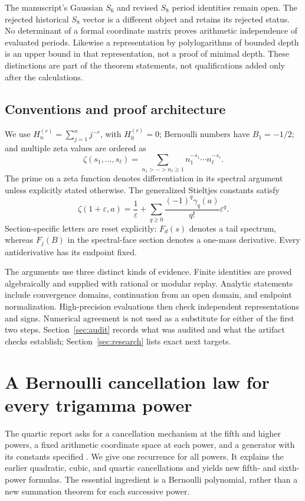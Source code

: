 \documentclass[11pt,a4paper]{article}
\numberwithin{equation}{section}
\theoremstyle{definition}
\theoremstyle{remark}
\begin{document}
The manuscript's Gaussian $S_6$ and revised $S_8$ period identities
remain open. The rejected historical $S_8$ vector is a different object
and retains its rejected status. No determinant of a formal coordinate
matrix proves arithmetic independence of evaluated periods. Likewise a
representation by polylogarithms of bounded depth is an upper bound in
that representation, not a proof of minimal depth. These distinctions
are part of the theorem statements, not qualifications added only after
the calculations.

\subsection{Conventions and proof architecture}

We use $H_n^{(r)}=\sum_{j=1}^n j^{-r}$, with $H_0^{(r)}=0$;
Bernoulli numbers have $B_1=-1/2$; and multiple zeta values are ordered
as
\[
 \zeta(s_1,\ldots,s_\ell)
 =\sum_{n_1>\cdots>n_\ell\ge1}
                         n_1^{-s_1}\cdots n_\ell^{-s_\ell}.
\]
The prime on a zeta function denotes differentiation in its spectral
argument unless explicitly stated otherwise. The generalized Stieltjes
constants satisfy
\[
 \zeta(1+\varepsilon,a)=\frac1\varepsilon+
       \sum_{q\ge0}\frac{(-1)^q\gamma_q(a)}{q!}\varepsilon^q.
\]
Section-specific letters are reset explicitly: $F_d(s)$ denotes a tail
spectrum, whereas $F_j(B)$ in the spectral-face section denotes a
one-mass derivative. Every antiderivative has its endpoint fixed.

The arguments use three distinct kinds of evidence. Finite identities
are proved algebraically and supplied with rational or modular replay.
Analytic statements include convergence domains, continuation from an
open domain, and endpoint normalization. High-precision evaluations
then check independent representations and signs. Numerical agreement
is not used as a substitute for either of the first two steps.
Section~\ref{sec:audit} records what was audited and what the artifact
checks establish; Section~\ref{sec:research} lists exact next targets.



\section{A Bernoulli cancellation law for every trigamma power}
\label{tp:sec:allpowers}

The quartic report asks for a cancellation mechanism at the fifth and
higher powers, a fixed arithmetic coordinate space at each power, and a
generator with its constants specified \cite[Research question R4]{RepoQuartic}.
We give one recurrence for all powers.  It explains the earlier quadratic,
cubic, and quartic cancellations and yields new fifth- and sixth-power
formulas.  The essential ingredient is a Bernoulli polynomial, rather than
a new summation theorem for each successive power.
\end{document}
